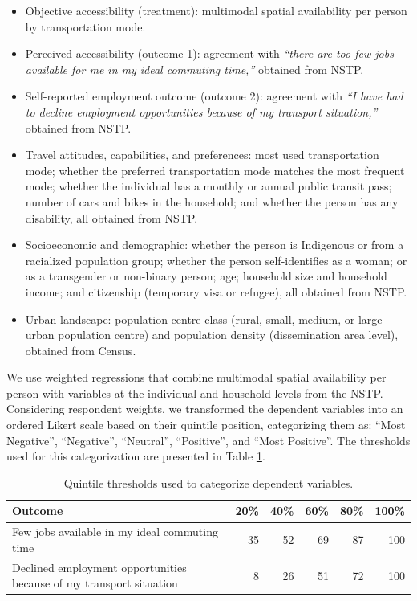 \documentclass[preprint, 3p,
authoryear]{elsarticle} %
\providecommand{\tightlist}{%
  \setlength{\itemsep}{0pt}\setlength{\parskip}{0pt}}
\begin{document}
\begin{itemize}
\tightlist
\item
  Objective accessibility (treatment): multimodal spatial availability
  per person by transportation mode.
\item
  Perceived accessibility (outcome 1): agreement with \emph{``there are
  too few jobs available for me in my ideal commuting time,''} obtained
  from NSTP.
\item
  Self-reported employment outcome (outcome 2): agreement with \emph{``I
  have had to decline employment opportunities because of my transport
  situation,''} obtained from NSTP.
\item
  Travel attitudes, capabilities, and preferences: most used
  transportation mode; whether the preferred transportation mode matches
  the most frequent mode; whether the individual has a monthly or annual
  public transit pass; number of cars and bikes in the household; and
  whether the person has any disability, all obtained from NSTP.
\item
  Socioeconomic and demographic: whether the person is Indigenous or
  from a racialized population group; whether the person self-identifies
  as a woman; or as a transgender or non-binary person; age; household
  size and household income; and citizenship (temporary visa or
  refugee), all obtained from NSTP.
\item
  Urban landscape: population centre class (rural, small, medium, or
  large urban population centre) and population density (dissemination
  area level), obtained from Census.
\end{itemize}

We use weighted regressions that combine multimodal spatial availability
per person with variables at the individual and household levels from
the NSTP. Considering respondent weights, we transformed the dependent
variables into an ordered Likert scale based on their quintile position,
categorizing them as: ``Most Negative'', ``Negative'', ``Neutral'',
``Positive'', and ``Most Positive''. The thresholds used for this
categorization are presented in Table \ref{tab:outcomes_quintiles}.

\begin{table}
\centering
\caption{\label{tab:outcomes-quintiles}\label{tab:outcomes_quintiles}Quintile thresholds used to categorize dependent variables.}
\centering
\fontsize{10}{12}\selectfont
\begin{tabular}[t]{lrrrrr}
\toprule
Outcome & 20\% & 40\% & 60\% & 80\% & 100\%\\
\midrule
Few jobs available in my ideal commuting time & 35 & 52 & 69 & 87 & 100\\
Declined employment opportunities because of my transport situation & 8 & 26 & 51 & 72 & 100\\
\bottomrule
\end{tabular}
\end{table}
\end{document}
